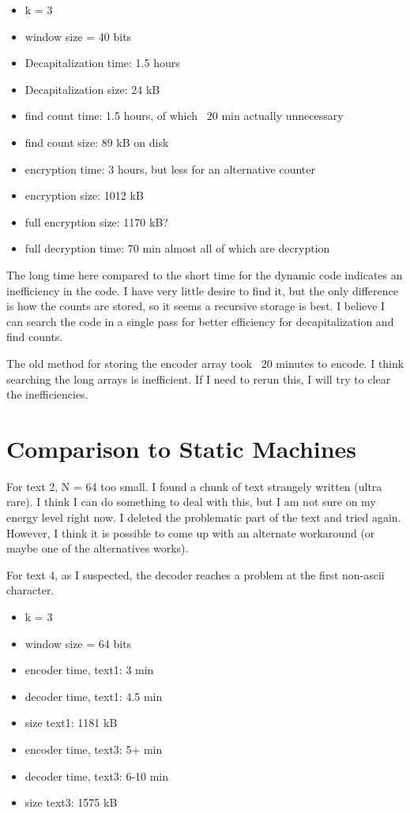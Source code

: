 \documentclass{article}
\begin{document}
\begin{itemize}
\item k = 3
\item window size = 40 bits
\item Decapitalization time: 1.5 hours
\item Decapitalization size: 24 kB
\item find count time: 1.5 hours, of which ~20 min actually unnecessary
\item find count size: 89 kB on disk
\item encryption time: 3 hours, but less for an alternative counter
\item encryption size: 1012 kB
\item full encryption size: 1170 kB?
\item full decryption time: 70 min almost all of which are decryption
\end{itemize}

The long time here compared to the short time for the dynamic code indicates an inefficiency in the code. I have very little desire to find it, but the only difference is how the counts are stored, so it seems a recursive storage is best. I believe I can search the code in a single pass for better efficiency for decapitalization and find counts.

The old method for storing the encoder array took ~20 minutes to encode. I think searching the long arrays is inefficient. If I need to rerun this, I will try to clear the inefficiencies.


\section{Comparison to Static Machines}

For text 2, N = 64 too small. I found a chunk of text strangely written (ultra rare). I think I can do something to deal with this, but I am not sure on my energy level right now. I deleted the problematic part of the text and tried again. However, I think it is possible to come up with an alternate workaround (or maybe one of the alternatives works). 

For text 4, as I suspected, the decoder reaches a problem at the first non-ascii character.


\begin{itemize}
\item k = 3
\item window size = 64 bits
\item encoder time, text1: 3 min
\item decoder time, text1: 4.5 min
\item size text1: 1181 kB
\item encoder time, text3: 5+ min
\item decoder time, text3: 6-10 min
\item size text3: 1575 kB
\end{itemize}
\end{document}
